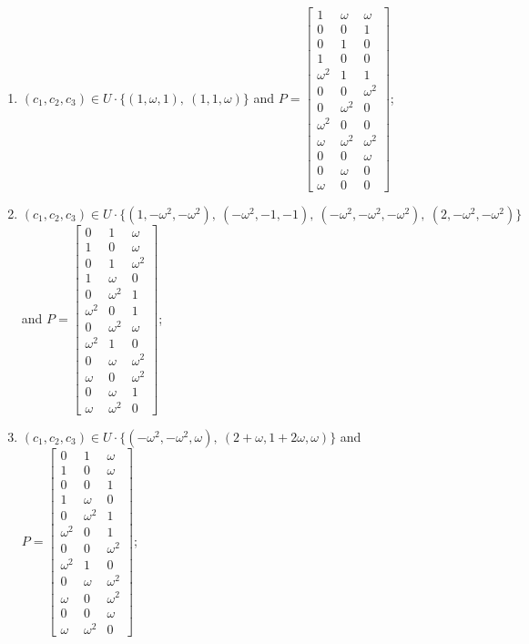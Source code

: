 \begin{enumerate}
\item[(f74)\,\newitem] $(c_1,c_2,c_3)\in U\cdot\{(1,\omega,1),\allowbreak\ (1,1,\omega)\}$ and $P=\begin{bmatrix}1&\omega&\omega\\0&0&1\\0&1&0\\1&0&0\\\omega^2&1&1\\0&0&\omega^2\\0&\omega^2&0\\\omega^2&0&0\\\omega&\omega^2&\omega^2\\0&0&\omega\\0&\omega&0\\\omega&0&0\end{bmatrix}$;
\item[(f75)\,\newitem] $(c_1,c_2,c_3)\in U\cdot\{(1,-\omega^2,-\omega^2),\allowbreak\ (-\omega^2,-1,-1),\allowbreak\ (-\omega^2,-\omega^2,-\omega^2),\allowbreak\ (2,-\omega^2,-\omega^2)\}$ and $P=\begin{bmatrix}0&1&\omega\\1&0&\omega\\0&1&\omega^2\\1&\omega&0\\0&\omega^2&1\\\omega^2&0&1\\0&\omega^2&\omega\\\omega^2&1&0\\0&\omega&\omega^2\\\omega&0&\omega^2\\0&\omega&1\\\omega&\omega^2&0\end{bmatrix}$;
\item[(f76)\,\newitem] $(c_1,c_2,c_3)\in U\cdot\{(-\omega^2,-\omega^2,\omega),\allowbreak\ (2+\omega,1+2\omega,\omega)\}$ and $P=\begin{bmatrix}0&1&\omega\\1&0&\omega\\0&0&1\\1&\omega&0\\0&\omega^2&1\\\omega^2&0&1\\0&0&\omega^2\\\omega^2&1&0\\0&\omega&\omega^2\\\omega&0&\omega^2\\0&0&\omega\\\omega&\omega^2&0\end{bmatrix}$;

\end{enumerate}
